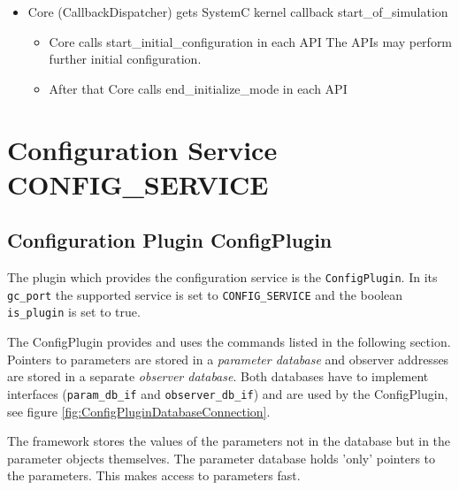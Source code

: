 \begin{itemize}
	\item Core (CallbackDispatcher) gets SystemC kernel callback start\_of\_simulation
	\begin{itemize}
		\item Core calls start\_initial\_configuration in each API  \newline The APIs may perform further initial configuration.
		\item After that Core calls end\_initialize\_mode in each API
	\end{itemize}
\end{itemize}



\section{Configuration Service CONFIG\_SERVICE}

\subsection{Configuration Plugin ConfigPlugin}
\label{ConfigPlugin}

The plugin which provides the configuration service is the \lstinline|ConfigPlugin|. In its \lstinline|gc_port| the supported service is set to \lstinline|CONFIG_SERVICE| and the boolean \lstinline|is_plugin| is set to true.

The ConfigPlugin provides and uses the commands listed in the following section. Pointers to parameters are stored in a \emph{parameter database} and observer addresses are stored in a separate \emph{observer database}. Both databases have to implement interfaces (\lstinline|param_db_if| and \lstinline|observer_db_if|) and are used by the ConfigPlugin, see figure \ref{fig:ConfigPluginDatabaseConnection}.%

The framework stores the values of the parameters not in the database but in the parameter objects themselves. The parameter database holds 'only' pointers to the parameters. This makes access to parameters fast.



